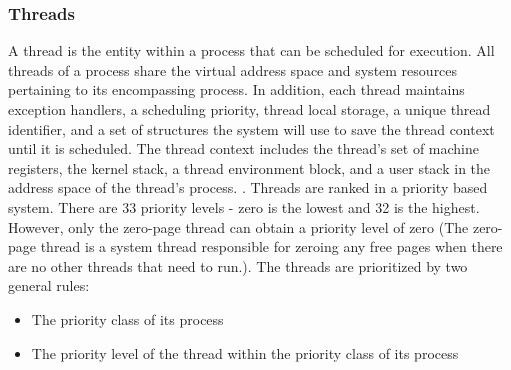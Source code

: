 \documentclass[onecolumn,draftclsnofoot, 10pt, compsoc]{IEEEtran}
\begin{document}
		\subsubsection{Threads}
			A thread is the entity within a process that can be scheduled for execution. 
			All threads of a process share the virtual address space and system resources pertaining to its encompassing process. In addition, each thread maintains exception handlers, a scheduling priority, thread local storage, a unique thread identifier, and a set of structures the system will use to save the thread context until it is scheduled. The thread context includes the thread's set of machine registers, the kernel stack, a thread environment block, and a user stack in the address space of the thread's process. \cite{windowsProcessMSDN}.
			Threads are ranked in a priority based system. 
			There are 33 priority levels - zero is the lowest and 32 is the highest. 
			However, only the zero-page thread can obtain a priority level of zero (The zero-page thread is a system thread responsible for zeroing any free pages when there are no other threads that need to run.).
			The threads are prioritized by two general rules:
			\begin{itemize}
				\item The priority class of its process
				\item The priority level of the thread within the priority class of its process
			\end{itemize}
	
	
\end{document}
